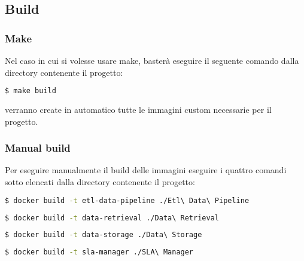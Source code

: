 \subsection{Build}
\subsubsection{Make}
Nel caso in cui si volesse usare make, basterà eseguire il seguente comando dalla directory contenente il progetto:
\begin{lstlisting}[language=bash]
    $ make build
\end{lstlisting}
verranno create in automatico tutte le immagini custom necessarie per il progetto.
\subsubsection{Manual build}
Per eseguire manualmente il build delle immagini eseguire i quattro comandi sotto elencati dalla directory contenente il progetto:
\begin{lstlisting}[language=bash]
  $ docker build -t etl-data-pipeline ./Etl\ Data\ Pipeline
\end{lstlisting}
\begin{lstlisting}[language=bash]
  $ docker build -t data-retrieval ./Data\ Retrieval
\end{lstlisting}

\begin{lstlisting}[language=bash]
  $ docker build -t data-storage ./Data\ Storage
\end{lstlisting}

\begin{lstlisting}[language=bash]
  $ docker build -t sla-manager ./SLA\ Manager
\end{lstlisting}
